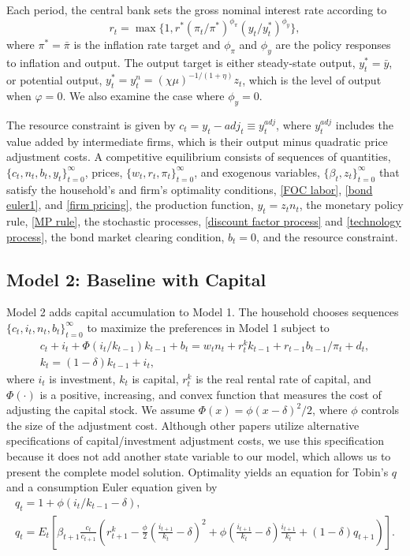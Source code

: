 \documentclass[12pt,final]{article}
\begin{document}
Each period, the central bank sets the gross nominal interest rate according to
\begin{equation}
  r_t=\max\{1,r^*(\pi_t/\pi^*)^{\phi_\pi}(y_t/y_t^*)^{\phi_y}\}, \label{MP rule}
\end{equation}
where $\pi^*=\bar{\pi}$ is the inflation rate target and $\phi_\pi$ and $\phi_y$ are the policy responses to inflation and output. The output target is either steady-state output, $y_t^*=\bar{y}$, or potential output, $y_t^*=y_t^n=(\chi\mu)^{-1/(1+\eta)}z_t$, which is the level of output when $\varphi=0$. We also examine the case where $\phi_{y}=0$.

The resource constraint is given by $c_t=y_t-adj_t\equiv y_t^{adj}$, where $y_t^{adj}$ includes the value added by intermediate firms, which is their output minus quadratic price adjustment costs. A competitive equilibrium consists of sequences of quantities, $\{c_t,n_t,b_t,y_t\}_{t=0}^\infty$, prices, $\{w_t,r_t,\pi_t\}_{t=0}^\infty$, and exogenous variables, $\{\beta_t,z_t\}_{t=0}^\infty$ that satisfy the household's and firm's optimality conditions, \eqref{FOC labor}, \eqref{bond euler1}, and \eqref{firm pricing}, the production function, $y_t=z_tn_t$, the monetary policy rule, \eqref{MP rule}, the stochastic processes, \eqref{discount factor process} and \eqref{technology process}, the bond market clearing condition, $b_t=0$, and the resource constraint.

\subsection{Model 2: Baseline with Capital}\label{sec:model2}

Model 2 adds capital accumulation to Model 1. The household chooses sequences $\{c_t,i_t,n_t,b_t\}_{t=0}^{\infty}$ to maximize the preferences in Model 1 subject to
\begin{gather}
  c_t+i_t+\Phi(i_t/k_{t-1})k_{t-1}+b_t=w_tn_t+r_t^kk_{t-1}+r_{t-1}b_{t-1}/\pi_t+d_t, \label{bc2}\\
  k_t=(1-\delta)k_{t-1}+i_t,  \label{inv2}
\end{gather}
where $i_t$ is investment, $k_t$ is capital, $r_t^k$ is the real rental rate of capital, and $\Phi(\cdot)$ is a positive, increasing, and convex function that measures the cost of adjusting the capital stock. We assume $\Phi(x)=\phi(x-\delta)^2/2$, where $\phi$ controls the size of the adjustment cost. Although other papers utilize alternative specifications of capital/investment adjustment costs, we use this specification because it does not add another state variable to our model, which allows us to present the complete model solution. Optimality yields an equation for Tobin's $q$ and a consumption Euler equation given by
\begin{gather}
  q_t=1+\phi(i_t/k_{t-1}-\delta), \label{Tobins q}\\
  q_t=E_t\left[\beta_{t+1}\frac{c_t}{c_{t+1}}\left(r_{t+1}^k-\frac{\phi}{2}\left(\frac{i_{t+1}}{k_t}-\delta\right)^2
  +\phi\left(\frac{i_{t+1}}{k_t}-\delta\right)\frac{i_{t+1}}{k_t}+(1-\delta)q_{t+1}\right)\right]. \label{FOC k}
\end{gather}
\end{document}
